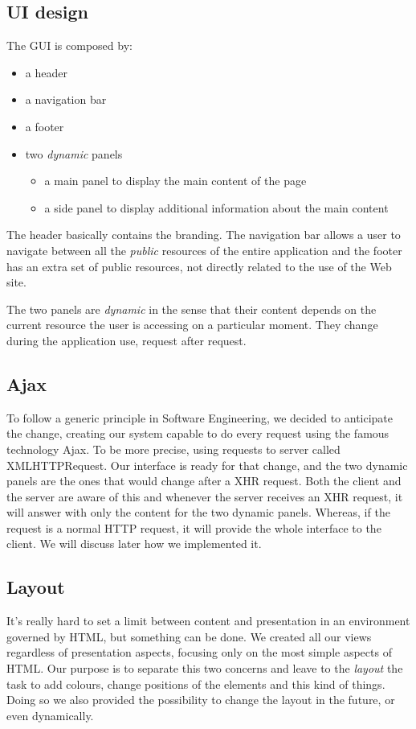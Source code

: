 \documentclass[10pt]{report}
\begin{document}
\subsection{UI design}
The GUI is composed by:
\begin{itemize}
\item a header
\item a navigation bar
\item a footer
\item two \emph{dynamic} panels
	\begin{itemize}
	\item a main panel to display the main content of the page
    \item a side panel to display additional information about the main content
	\end{itemize}
\end{itemize}
The header basically contains the branding. The navigation bar allows a user to navigate between all the \emph{public} resources of the entire application and the footer has an extra set of public resources, not directly related to the use of the Web site.

The two panels are \emph{dynamic} in the sense that their content depends on the current resource the user is accessing on a particular moment. They change during the application use, request after request.

\subsection{Ajax}
To follow a generic principle in Software Engineering, we decided to anticipate the change, creating our system capable to do every request using the famous technology Ajax. To be more precise, using requests to server called XMLHTTPRequest. Our interface is ready for that change, and the two dynamic panels are the ones that would change after a XHR request. Both the client and the server are aware of this and whenever the server receives an XHR request, it will answer with only the content for the two dynamic panels. Whereas, if the request is a normal HTTP request, it will provide the whole interface to the client. We will discuss later how we implemented it.

\subsection{Layout}
It's really hard to set a limit between content and presentation in an environment governed by HTML, but something can be done. We created all our views regardless of presentation aspects, focusing only on the most simple aspects of HTML. Our purpose is to separate this two concerns and leave to the \emph{layout} the task to add colours, change positions of the elements and this kind of things. Doing so we also provided the possibility to change the layout in the future, or even dynamically.
\end{document}
